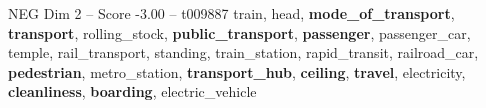 \begin{textsample}{NEG Dim 2 – Score -3.00 – t009887}  \label{ex:f2_neg_021}
train, head, \textbf{mode\_of\_transport}, \textbf{transport}, rolling\_stock, \textbf{public\_transport}, \textbf{passenger}, passenger\_car, temple, rail\_transport, standing, train\_station, rapid\_transit, railroad\_car, \textbf{pedestrian}, metro\_station, \textbf{transport\_hub}, \textbf{ceiling}, \textbf{travel}, electricity, \textbf{cleanliness}, \textbf{boarding}, electric\_vehicle

\end{textsample}

